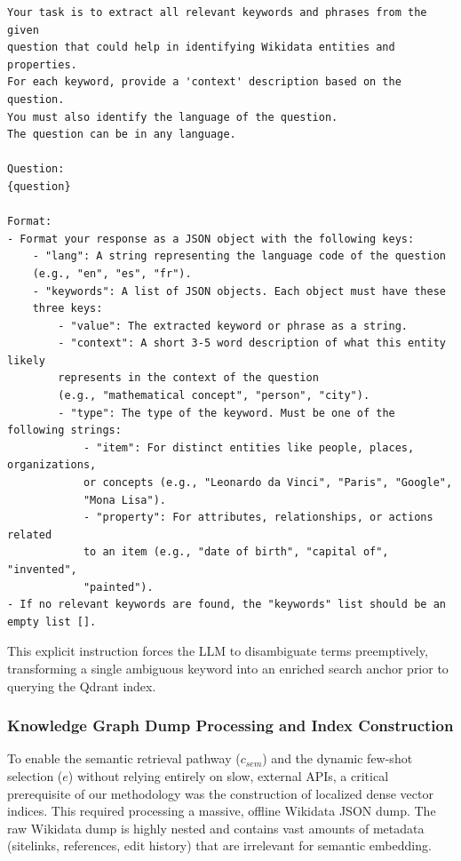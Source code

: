 \begin{lstlisting}[basicstyle=\ttfamily\footnotesize, frame=single, caption={The zero-shot System Prompt utilized by the Retrieval Node for concurrent Named Entity Recognition (NER) and Language Detection, enforcing a strict JSON output schema.}, label={lst:ner_prompt}]
Your task is to extract all relevant keywords and phrases from the given
question that could help in identifying Wikidata entities and properties. 
For each keyword, provide a 'context' description based on the question. 
You must also identify the language of the question.
The question can be in any language. 

Question: 
{question}

Format:
- Format your response as a JSON object with the following keys:
    - "lang": A string representing the language code of the question 
    (e.g., "en", "es", "fr").
    - "keywords": A list of JSON objects. Each object must have these 
    three keys:
        - "value": The extracted keyword or phrase as a string.
        - "context": A short 3-5 word description of what this entity likely 
        represents in the context of the question 
        (e.g., "mathematical concept", "person", "city").
        - "type": The type of the keyword. Must be one of the following strings:
            - "item": For distinct entities like people, places, organizations,
            or concepts (e.g., "Leonardo da Vinci", "Paris", "Google", 
            "Mona Lisa").
            - "property": For attributes, relationships, or actions related 
            to an item (e.g., "date of birth", "capital of", "invented",
            "painted").
- If no relevant keywords are found, the "keywords" list should be an 
empty list [].
\end{lstlisting}

This explicit instruction forces the LLM to disambiguate terms preemptively, transforming a single ambiguous keyword into an enriched search anchor prior to querying the Qdrant index.

\subsubsection{Knowledge Graph Dump Processing and Index Construction}
\label{sec:dump_processing}

To enable the semantic retrieval pathway ($c_{sem}$) and the dynamic few-shot selection ($e$) without relying entirely on slow, external APIs, a critical prerequisite of our methodology was the construction of localized dense vector indices. This required processing a massive, offline Wikidata JSON dump. The raw Wikidata dump is highly nested and contains vast amounts of metadata (sitelinks, references, edit history) that are irrelevant for semantic embedding. 

